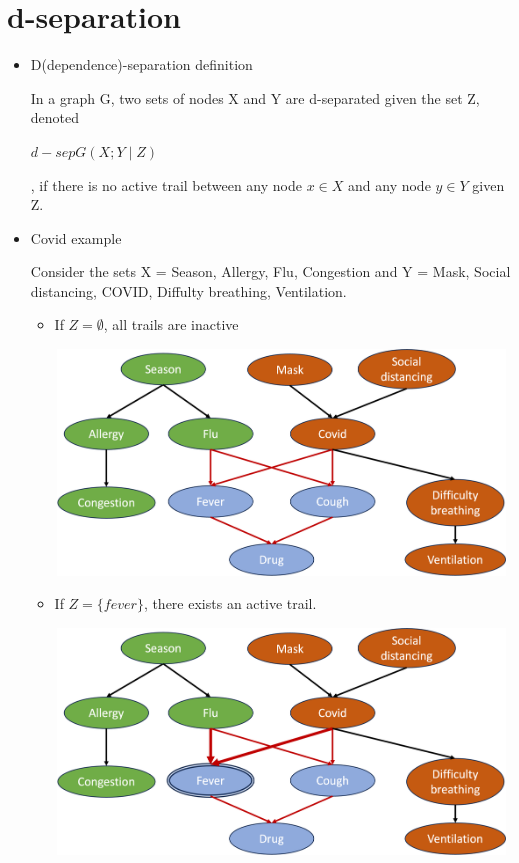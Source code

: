 \documentclass[11pt,a4paper]{report}
\begin{document}
\section{d-separation}

\begin{itemize}
    \item D(dependence)-separation definition
    
    In a graph G, two sets of nodes X and Y are d-separated given the set Z, denoted \begin{center}
        $d-sep{G}(X; Y \mid Z)$
    \end{center}, if there is no active trail between any node $x \in X$ and any node $y \in Y$ given Z.

    \item Covid example

    Consider the sets X = {Season, Allergy, Flu, Congestion} and Y = {Mask, Social distancing, COVID, Diffulty breathing, Ventilation}.
    \begin{itemize}
        \item If $Z = \emptyset$, all trails are inactive

        \includegraphics[width = 12cm, height = 6cm]{d_seq_inactive.png}
        \item If $Z = \{fever\}$, there exists an active trail.
       
        \includegraphics[width = 12cm, height = 6cm]{d_seq_active.png}
    \end{itemize}


\end{itemize}
\end{document}
